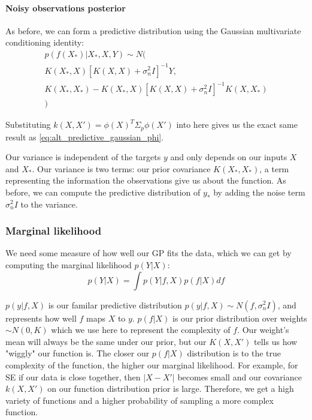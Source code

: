 \paragraph{Noisy observations posterior}
As before, we can form a predictive distribution using the Gaussian multivariate conditioning identity:
\begin{equation*}
    \begin{aligned}
        p(f(X_*)|X_*, X, Y) \sim N( \\
        K(X_*,X)[K(X,X) + \sigma^2_nI]^{-1}Y, \\
        K(X_*,X_*) - K(X_*,X)[K(X,X) + \sigma^2_nI]^{-1}K(X,X_*) \\
        )
    \end{aligned}
\end{equation*}

Substituting $k(X,X') = \phi(X)^T\Sigma_p\phi(X')$ into here gives us the exact same result as \ref{eq:alt_predictive_gaussian_phi}.

Our variance is independent of the targets $y$ and only depends on our inputs $X$ and $X_*$. Our variance is two terms: our prior covariance $K(X_*,X_*)$, a term representing the information the observations give us about the function. As before, we can compute the predictive distribution of $y_*$ by adding the noise term $\sigma^2_nI$ to the variance.

\subsubsection{Marginal likelihood}
We need some measure of how well our GP fits the data, which we can get by computing the marginal likelihood $p(Y|X)$:
\begin{equation*}
    p(Y|X) = \int p(Y|f,X)p(f|X) df
\end{equation*}

$p(y|f,X)$ is our familar predictive distribution $p(y|f,X) \sim N(f, \sigma^2_nI)$, and represents how well $f$ maps $X$ to $y$. $p(f|X)$ is our prior distribution over weights $\sim N(0, K)$ which we use here to represent the complexity of $f$. Our weight's mean will always be the same under our prior, but our $K(X,X')$ tells us how "wiggly" our function is. The closer our $p(f|X)$ distribution is to the true complexity of the function, the higher our marginal likelihood. For example, for SE if our data is close together, then $|X - X'|$ becomes small and our covariance $k(X,X')$ on our function distribution prior is large. Therefore, we get a high variety of functions and a higher probability of sampling a more complex function. %
    

